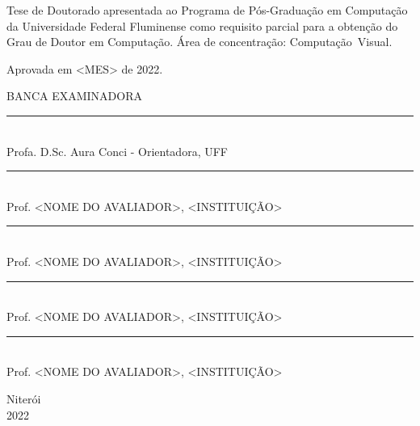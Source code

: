 \noindent
\begin{flushright}
\begin{minipage}[t]{8cm}

Tese de Doutorado apresentada ao Programa de P\'{o}s-Gradua\c{c}\~{a}o em Computa\c{c}\~{a}o da Universidade Federal Fluminense como requisito parcial para a obten\c{c}\~{a}o do \mbox{Grau} de Doutor em Computa\c{c}\~{a}o. \'{A}rea de concentra\c{c}\~{a}o: \mbox{Computação Visual.} %

\end{minipage}
\end{flushright}
\vspace{1.0 cm}
\noindent
Aprovada em <MES> de 2022. \\
\begin{flushright}
  {
  \begin{center}
  BANCA EXAMINADORA \\
  \vspace{6mm}
  \rule{11cm}{.1mm} \\
    Profa. D.Sc. Aura Conci - Orientadora, UFF \\
    \vspace{6mm}
  \rule{11cm}{.1mm} \\
    Prof. <NOME DO AVALIADOR>, <INSTITUI\c{C}\~AO>\\
    \vspace{6mm}
  \rule{11cm}{.1mm} \\
    Prof. <NOME DO AVALIADOR>, <INSTITUI\c{C}\~AO>\\
  \vspace{4mm}
  \rule{11cm}{.1mm} \\
    Prof. <NOME DO AVALIADOR>, <INSTITUI\c{C}\~AO>\\
    \vspace{6mm}
  \rule{11cm}{.1mm} \\
    Prof. <NOME DO AVALIADOR>, <INSTITUI\c{C}\~AO>\\
  \vspace{6mm}
  \end{center}
  }
\end{flushright}
\begin{center}
  \vspace{4mm}
  Niter\'{o}i \\
  2022

\end{center}

\cleardoublepage
\thispagestyle{empty}
\vspace*{200mm}

